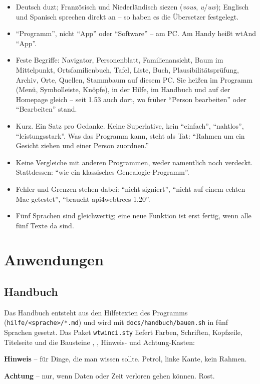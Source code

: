 \documentclass[a4paper, 11pt, parskip=half, headings=small, numbers=noenddot]{scrartcl}
\begin{document}
\begin{itemize}
\item Deutsch duzt; Französisch und Niederländisch siezen (\emph{vous}, \emph{u}/\emph{uw}); Englisch und Spanisch sprechen direkt an – so haben es die Übersetzer festgelegt.
\item \enquote{Programm}, nicht \enquote{App} oder \enquote{Software} – am PC. Am Handy heißt wtAnd \enquote{App}.
\item Feste Begriffe: Navigator, Personenblatt, Familienansicht, Baum im Mittelpunkt, Ortsfamilienbuch, Tafel, Liste, Buch, Plausibilitätsprüfung, Archiv, Orte, Quellen, Stammbaum auf diesem PC. Sie heißen im Programm (Menü, Symbolleiste, Knöpfe), in der Hilfe, im Handbuch und auf der Homepage gleich – seit 1.53 auch dort, wo früher \enquote{Person bearbeiten} oder \enquote{Bearbeiten} stand.
\item Kurz. Ein Satz pro Gedanke. Keine Superlative, kein \enquote{einfach}, \enquote{nahtlos}, \enquote{leistungsstark}. Was das Programm kann, steht als Tat: \enquote{Rahmen um ein Gesicht ziehen und einer Person zuordnen.}
\item Keine Vergleiche mit anderen Programmen, weder namentlich noch verdeckt. Stattdessen: \enquote{wie ein klassisches Genealogie-Programm}.
\item Fehler und Grenzen stehen dabei: \enquote{nicht signiert}, \enquote{nicht auf einem echten Mac getestet}, \enquote{braucht api4webtrees 1.20}.
\item Fünf Sprachen sind gleichwertig; eine neue Funktion ist erst fertig, wenn alle fünf Texte da sind.
\end{itemize}

\section{Anwendungen}

\subsection{Handbuch}

Das Handbuch entsteht aus den Hilfetexten des Programms (\texttt{hilfe/<sprache>/*.md}) und wird mit \texttt{docs/handbuch/bauen.sh} in fünf Sprachen gesetzt. Das Paket \texttt{wtwinci.sty} liefert Farben, Schriften, Kopfzeile, Titelseite und die Bausteine , , Hinweis- und Achtung-Kasten:

\begin{hinweis}
\textbf{Hinweis} – für Dinge, die man wissen sollte. Petrol, linke Kante, kein Rahmen.
\end{hinweis}
\begin{achtung}
\textbf{Achtung} – nur, wenn Daten oder Zeit verloren gehen können. Rost.
\end{achtung}
\end{document}
